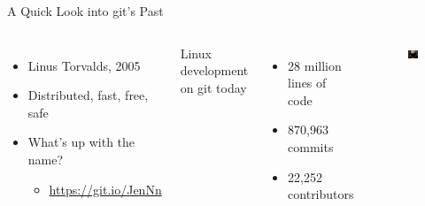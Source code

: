 \documentclass{beamer}
\begin{document}
    \begin{frame}{A Quick Look into git's Past}
        \begin{columns}
            \begin{itemize}
                \item Linus Torvalds, 2005
                \item Distributed, fast, free, safe
                \item What's up with the name?
                \begin{itemize}
                    \item \url{https://git.io/JenNn}
                \end{itemize}
            \end{itemize}

            Linux development on git today
            \begin{itemize}
                \item 28 million lines of code
                \item 870,963 commits
                \item 22,252 contributors
            \end{itemize}

            \begin{figure}
                \centering
                \includegraphics[width=\textwidth]{figures/linus.jpg}
            \end{figure}
        \end{columns}



    \end{frame}
\end{document}
